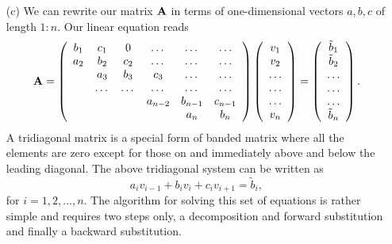 \documentclass[11pt,a4wide]{article}
\begin{document}
\begin{enumerate}
\item[(c)]
We can rewrite our matrix ${\bf A}$ in terms of one-dimensional vectors $a,b,c$  
of length $1:n$. 
Our linear equation reads
\begin{equation}
    {\bf A} = \left(\begin{array}{cccccc}
                           b_1& c_1 & 0 &\dots   & \dots &\dots \\
                           a_2 & b_2 & c_2 &\dots &\dots &\dots \\
                           & a_3 & b_3 & c_3 & \dots & \dots \\
                           & \dots   & \dots &\dots   &\dots & \dots \\
                           &   &  &a_{n-2}  &b_{n-1}& c_{n-1} \\
                           &    &  &   &a_n & b_n \\
                      \end{array} \right)\left(\begin{array}{c}
                           v_1\\
                           v_2\\
                           \dots \\
                          \dots  \\
                          \dots \\
                           v_n\\
                      \end{array} \right)
  =\left(\begin{array}{c}
                           \tilde{b}_1\\
                           \tilde{b}_2\\
                           \dots \\
                           \dots \\
                          \dots \\
                           \tilde{b}_n\\
                      \end{array} \right).
\end{equation}
A tridiagonal matrix is a special form of banded matrix where all the elements are zero except for 
those on and immediately above and below the leading diagonal.
The above tridiagonal system   can be written as
\begin{equation}
  a_iv_{i-1}+b_iv_i+c_iv_{i+1} = \tilde{b}_i,
\end{equation}
for $i=1,2,\dots,n$. 
The algorithm for solving this set of equations is rather simple and requires two steps only, a decomposition 
and forward substitution and finally a backward substitution. 



\end{enumerate}
\end{document}
